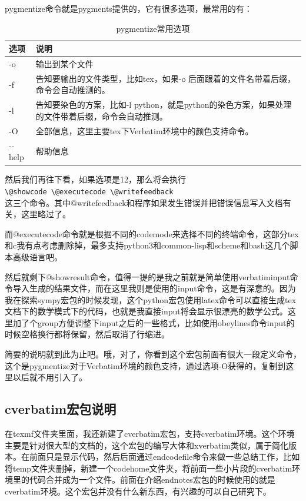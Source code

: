\documentclass[11pt,oneside]{book}
\begin{document}
\begin{common-format}
pygmentize命令就是pygments提供的，它有很多选项，最常用的有：
\begin{table}[H]
\centering
\label{tab:pygmentize常用选项}
\caption{pygmentize常用选项}
\medskip 
\begin{tabular}{@{}lp{28em}@{}}
\toprule
选项 & 说明  \\ \midrule
-o  & 输出到某个文件  \\
-f  & 告知要输出的文件类型，比如tex，如果-o 后面跟着的文件名带着后缀，命令会自动推测的。 \\
-l & 告知要染色的方案，比如-l python，就是python的染色方案，如果处理的文件带着后缀，命令会自动推测。  \\
-O & 全部信息，这里主要tex下Verbatim环境中的颜色支持命令。 \\
-{}-help  & 帮助信息 \\ \bottomrule
\end{tabular}
\end{table}

然后我们再往下看，如果选项是12，那么将会执行\\
\verb+\@showcode \@executecode \@writefeedback+\\
这三个命令。其中@writefeedback和程序如果发生错误并把错误信息写入文档有关，这里略过了。

而@executecode命令就是根据不同的codemode来选择不同的终端命令，这部分tex和c我有点考虑删除掉，最多支持python3和common-lisp和scheme和bash这几个脚本高级语言吧。

然后就剩下@showresult命令，值得一提的是我之前就是简单使用verbatiminput命令导入生成的结果文件，而在这里我则是使用的input命令，这是有深意的。因为我在探索sympy宏包的时候发现，这个python宏包使用latex命令可以直接生成tex文档下的数学模式下的代码，也就是我直接input将会显示很漂亮的数学公式。这里加了个group方便调整下input之后的一些格式，比如使用obeylines命令input的时候空格换行都将保留，然后取消了行缩进。

简要的说明就到此为止吧。哦，对了，你看到这个宏包前面有很大一段定义命令，这个是pygmentize对于Verbatim环境的颜色支持，通过选项-O获得的，复制到这里以后就不用引入了。


\subsection{cverbatim宏包说明}
在texmf文件夹里面，我还新建了cverbatim宏包，支持cverbatim环境。这个环境主要是针对很大型的文档的，这个宏包的编写大体和xverbatim类似，属于简化版本。在前面只是显示代码，然后后面通过endcodefile命令来做一些总结工作，比如将temp文件夹删掉，新建一个codehome文件夹，将前面一些小片段的cverbatim环境里的代码合并成为一个文件。前面在介绍endnotes宏包的时候使用的就是cverbatim环境。这个宏包并没有什么新东西，有兴趣的可以自己研究下。





\end{common-format}
\end{document}
